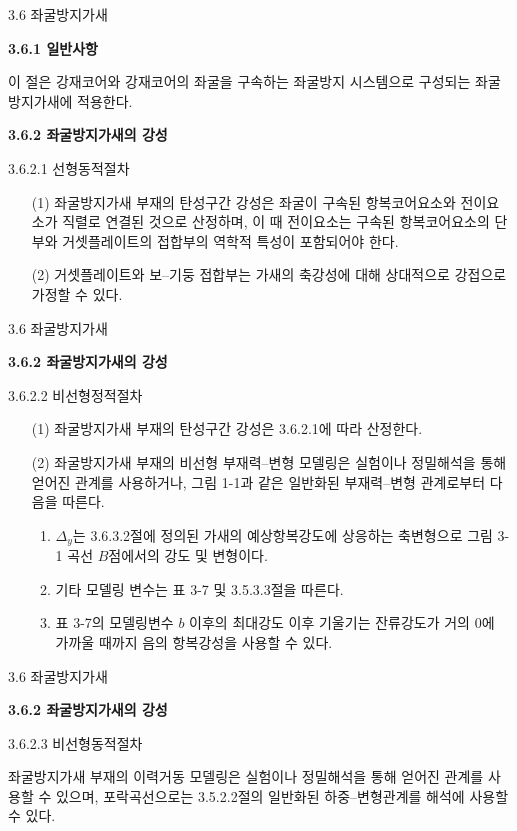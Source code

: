 \begin{frame}{3.6 좌굴방지가새}

\textbf{3.6.1 일반사항}

이 절은 강재코어와 강재코어의 좌굴을 구속하는 좌굴방지 시스템으로 구성되는 좌굴방지가새에 적용한다. 

\textbf{3.6.2 좌굴방지가새의 강성}

3.6.2.1 선형동적절차

\begin{enumerate}
	\item[(1)] 좌굴방지가새 부재의 탄성구간 강성은 좌굴이 구속된 항복코어요소와 전이요소가 직렬로 연결된 것으로 산정하며, 이 때 전이요소는 구속된 항복코어요소의 단부와 거셋플레이트의 접합부의 역학적 특성이 포함되어야 한다. 
	\item[(2)] 거셋플레이트와 보--기둥 접합부는 가새의 축강성에 대해 상대적으로 강접으로 가정할 수 있다. 
\end{enumerate}

\end{frame}



\begin{frame}{3.6 좌굴방지가새}

	\textbf{3.6.2 좌굴방지가새의 강성}

	3.6.2.2 비선형정적절차
	
	\begin{enumerate}
		\item[(1)] 좌굴방지가새 부재의 탄성구간 강성은 3.6.2.1에 따라 산정한다. 
		\item[(2)] 좌굴방지가새 부재의 비선형 부재력--변형 모델링은 실험이나 정밀해석을 통해 얻어진 관계를 사용하거나, 그림 1-1과 같은 일반화된 부재력--변형 관계로부터 다음을 따른다. 
		\begin{enumerate}[label=\large\protect\textcircled{\small\arabic*}]
			\item $\Delta_y$는 3.6.3.2절에 정의된 가새의 예상항복강도에 상응하는 축변형으로 그림 3-1 곡선 $B$점에서의 강도 및 변형이다. 
			\item 기타 모델링 변수는 표 3-7 및 3.5.3.3절을 따른다. 
			\item 표 3-7의 모델링변수 $b$ 이후의 최대강도 이후 기울기는 잔류강도가 거의 0에 가까울 때까지 음의 항복강성을 사용할 수 있다. 
		\end{enumerate}	
	\end{enumerate}
\end{frame}



\begin{frame}{3.6 좌굴방지가새}

	\textbf{3.6.2 좌굴방지가새의 강성}

	3.6.2.3 비선형동적절차
	
	좌굴방지가새 부재의 이력거동 모델링은 실험이나 정밀해석을 통해 얻어진 관계를 사용할 수 있으며, 포락곡선으로는 3.5.2.2절의 일반화된 하중--변형관계를 해석에 사용할 수 있다.  
\end{frame}	





